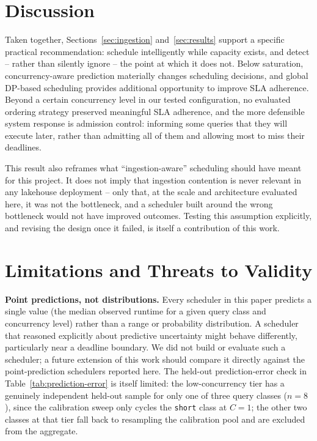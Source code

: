 \documentclass[conference]{IEEEtran}
\begin{document}
\section{Discussion}

Taken together, Sections~\ref{sec:ingestion} and~\ref{sec:results} support a specific practical recommendation: schedule intelligently while capacity exists, and detect -- rather than silently ignore -- the point at which it does not. Below saturation, concurrency-aware prediction materially changes scheduling decisions, and global DP-based scheduling provides additional opportunity to improve SLA adherence. Beyond a certain concurrency level in our tested configuration, no evaluated ordering strategy preserved meaningful SLA adherence, and the more defensible system response is admission control: informing some queries that they will execute later, rather than admitting all of them and allowing most to miss their deadlines.

This result also reframes what ``ingestion-aware'' scheduling should have meant for this project. It does not imply that ingestion contention is never relevant in any lakehouse deployment -- only that, at the scale and architecture evaluated here, it was not the bottleneck, and a scheduler built around the wrong bottleneck would not have improved outcomes. Testing this assumption explicitly, and revising the design once it failed, is itself a contribution of this work.

\section{Limitations and Threats to Validity}
\label{sec:limitations}

\textbf{Point predictions, not distributions.} Every scheduler in this paper predicts a single value (the median observed runtime for a given query class and concurrency level) rather than a range or probability distribution. A scheduler that reasoned explicitly about predictive uncertainty might behave differently, particularly near a deadline boundary. We did not build or evaluate such a scheduler; a future extension of this work should compare it directly against the point-prediction schedulers reported here. The held-out prediction-error check in Table~\ref{tab:prediction-error} is itself limited: the low-concurrency tier has a genuinely independent held-out sample for only one of three query classes ($n{=}8$), since the calibration sweep only cycles the \texttt{short} class at $C{=}1$; the other two classes at that tier fall back to resampling the calibration pool and are excluded from the aggregate.
\end{document}
